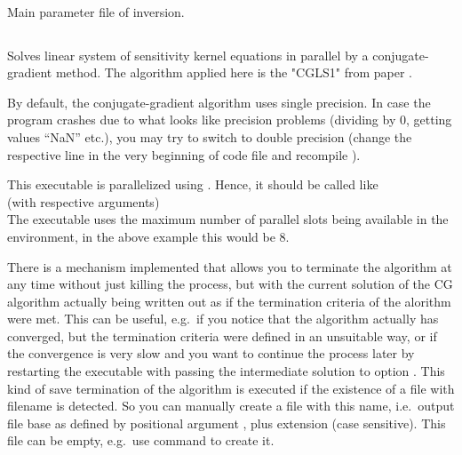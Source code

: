 \paragraph{}
Main parameter file of inversion.  
%
%
\subsection{} \label{programs_scripts,sec:bin_prog,sec:solve_cgls_kernel_sys}
Solves linear system of sensitivity kernel equations in parallel by a conjugate-gradient method.
The algorithm applied here is the "CGLS1" from paper \cite{bjorck1998stability}.

By default, the conjugate-gradient algorithm uses single precision. In case the program crashes due to what
looks like precision problems (dividing by 0, getting values ``NaN'' etc.), you may try to switch to 
double precision (change the respective line in the very beginning of code file 
and recompile ).

This executable is parallelized using . Hence, it should be called like\\
 (with respective arguments)\\
The executable uses the maximum number of parallel slots being available in the  environment, in 
the above example this would be 8.

There is a mechanism implemented that allows you to terminate the algorithm at any time without just killing
the process, but with the current solution of the CG algorithm actually being written out as if the termination
criteria of the alorithm were met. 
This can be useful, e.g.\ if you notice that the algorithm actually has converged, but the termination
criteria were defined in an unsuitable way, or if the convergence is very slow and you want to continue
the process later by restarting the executable with passing the intermediate solution to option . 
This kind of save termination of the algorithm is executed if the existence of a file with filename
 is detected. So you can manually create a file with this name, i.e.\ 
output file base as defined by positional argument , plus extension 
(case sensitive). This file can be empty, e.g.\ use command \lcode{touch} to create it.

